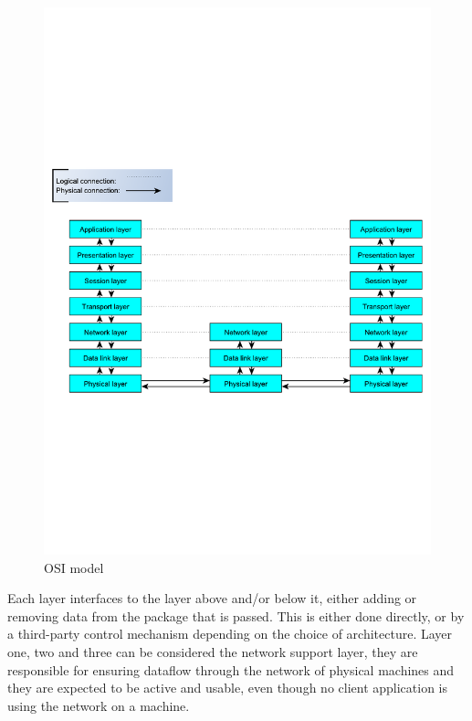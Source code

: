 \begin{figure}[htb]
	\begin{center}
	\includegraphics[scale=0.5,trim=0 0 0 0]{content/graphics/OsiStack.pdf} %
	\caption{OSI model}
	\label{fig:osi_model_stack}			%
	\end{center}
\end{figure}


Each layer interfaces to the layer above and/or below it, either adding or removing data from the package that is passed. This is either done directly, or by a third-party control mechanism depending on the choice of architecture.
Layer one, two and three can be considered the network support layer, they are responsible for ensuring dataflow through the network of physical machines and they are expected to be active and usable, even though no client application is using the network on a machine.

